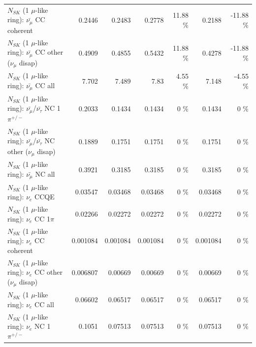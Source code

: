 \begin{table}
\begin{tabular}{| l | r | r | r  r | r  r |}
                       $N_{SK}$ (1 $\mu$-like ring): $\bar{\nu_\mu}$ CC coherent &          0.2446 &          0.2483 &          0.2778 &    11.88 \%  &          0.2188 &   -11.88 \%  \\ 
        $N_{SK}$ (1 $\mu$-like ring): $\bar{\nu_\mu}$ CC other ($\nu_\mu$ disap) &          0.4909 &          0.4855 &          0.5432 &    11.88 \%  &          0.4278 &   -11.88 \%  \\ 
                          $N_{SK}$ (1 $\mu$-like ring): $\bar{\nu_{\mu}}$ CC all &           7.702 &           7.489 &            7.83 &     4.55 \%  &           7.148 &    -4.55 \%  \\ 
\hline
  $N_{SK}$ (1 $\mu$-like ring): $\bar{\nu_\mu}$/$\bar{\nu_\tau}$ NC 1$\pi^{+/-}$ &          0.2033 &          0.1434 &          0.1434 &        0 \%  &          0.1434 &        0 \%  \\ 
$N_{SK}$ (1 $\mu$-like ring): $\bar{\nu_\mu}$/$\bar{\nu_\tau}$ NC other ($\nu_\mu$ disap) &          0.1889 &          0.1751 &          0.1751 &        0 \%  &          0.1751 &        0 \%  \\ 
                          $N_{SK}$ (1 $\mu$-like ring): $\bar{\nu_{\mu}}$ NC all &          0.3921 &          0.3185 &          0.3185 &        0 \%  &          0.3185 &        0 \%  \\ 
\hline
\hline
\hline
                                      $N_{SK}$ (1 $\mu$-like ring): $\nu_e$ CCQE &         0.03547 &         0.03468 &         0.03468 &        0 \%  &         0.03468 &        0 \%  \\ 
                                 $N_{SK}$ (1 $\mu$-like ring): $\nu_e$ CC 1$\pi$ &         0.02266 &         0.02272 &         0.02272 &        0 \%  &         0.02272 &        0 \%  \\ 
                               $N_{SK}$ (1 $\mu$-like ring): $\nu_e$ CC coherent &        0.001084 &        0.001084 &        0.001084 &        0 \%  &        0.001084 &        0 \%  \\ 
                $N_{SK}$ (1 $\mu$-like ring): $\nu_e$ CC other ($\nu_\mu$ disap) &        0.006807 &         0.00669 &         0.00669 &        0 \%  &         0.00669 &        0 \%  \\ 
                                  $N_{SK}$ (1 $\mu$-like ring): $\nu_{e}$ CC all &         0.06602 &         0.06517 &         0.06517 &        0 \%  &         0.06517 &        0 \%  \\ 
\hline
                           $N_{SK}$ (1 $\mu$-like ring): $\nu_e$ NC 1$\pi^{+/-}$ &          0.1051 &         0.07513 &         0.07513 &        0 \%  &         0.07513 &        0 \%  \\ 

\end{tabular}
\end{table}
